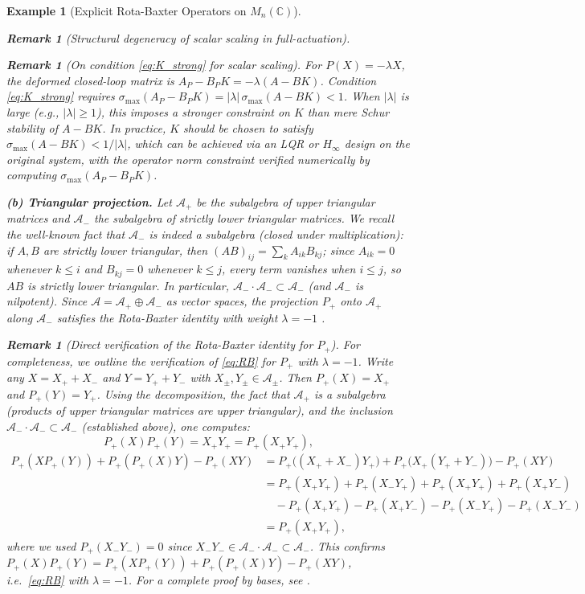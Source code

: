 \documentclass[10pt]{amsart}
\newcommand{\Ac}{\mathcal{A}}
\numberwithin{equation}{section}
\newtheorem{remark}[theorem]{Remark}
\newtheorem{example}[theorem]{Example}
\begin{document}
\begin{example}[Explicit Rota-Baxter Operators on \(M_n(\mathbb{C})\)]
\begin{remark}[Structural degeneracy of scalar scaling in full-actuation]
\begin{remark}[On condition \eqref{eq:K_strong} for scalar scaling]\label{rem:K_strong_scalar}
For $P(X)=-\lambda X$, the deformed closed-loop matrix is
$A_P - B_PK = -\lambda(A - BK)$. Condition \eqref{eq:K_strong} requires
$\sigma_{\max}(A_P - B_PK) = |\lambda|\,\sigma_{\max}(A-BK) < 1$.
When $|\lambda|$ is large (e.g., $|\lambda| \geq 1$), this imposes a stronger
constraint on $K$ than mere Schur stability of $A-BK$. In practice, $K$ should be
chosen to satisfy $\sigma_{\max}(A-BK) < 1/|\lambda|$, which can be achieved via
an LQR or $H_\infty$ design on the original system, with the operator norm
constraint verified numerically by computing $\sigma_{\max}(A_P-B_PK)$.
\end{remark}
\end{remark}

\medskip
\noindent\textbf{(b) Triangular projection.}
Let \(\Ac_+\) be the subalgebra of upper triangular matrices and \(\Ac_-\) the
subalgebra of strictly lower triangular matrices. We recall the well-known fact that
\(\Ac_-\) is indeed a subalgebra (closed under multiplication): if $A,B$ are strictly
lower triangular, then $(AB)_{ij} = \sum_k A_{ik}B_{kj}$; since $A_{ik}=0$ whenever
$k \leq i$ and $B_{kj}=0$ whenever $k \leq j$, every term vanishes when $i \leq j$, so
$AB$ is strictly lower triangular. In particular, $\Ac_-\cdot\Ac_- \subset \Ac_-$ (and
$\Ac_-$ is nilpotent). Since \(\Ac = \Ac_+ \oplus \Ac_-\) as vector spaces, the
projection \(P_+\) onto \(\Ac_+\) along \(\Ac_-\) satisfies the Rota-Baxter identity
with weight \(\lambda=-1\) \cite{BaiGuoNi2011}.

\begin{remark}[Direct verification of the Rota-Baxter identity for $P_+$]
\label{rem:RB_Pplus}
For completeness, we outline the verification of \eqref{eq:RB} for $P_+$ with
$\lambda = -1$. Write any $X = X_+ + X_-$ and $Y = Y_+ + Y_-$ with
$X_\pm, Y_\pm \in \Ac_\pm$. Then $P_+(X) = X_+$ and $P_+(Y) = Y_+$. Using the
decomposition, the fact that $\Ac_+$ is a subalgebra (products of upper triangular
matrices are upper triangular), and the inclusion $\Ac_-\cdot\Ac_- \subset \Ac_-$
(established above), one computes:
\[
  P_+(X)P_+(Y) = X_+ Y_+ = P_+(X_+Y_+),
\]
\begin{align*}
  P_+(XP_+(Y)) + P_+(P_+(X)Y) - P_+(XY)
  &= P_+\bigl((X_++X_-)Y_+\bigr) + P_+\bigl(X_+(Y_++Y_-)\bigr) - P_+(XY) \\
  &= P_+(X_+Y_+) + P_+(X_-Y_+)
     + P_+(X_+Y_+) + P_+(X_+Y_-)\\
  &\quad - P_+(X_+Y_+) - P_+(X_+Y_-)
     - P_+(X_-Y_+) - P_+(X_-Y_-)\\
  &= P_+(X_+Y_+),
\end{align*}
where we used $P_+(X_-Y_-) = 0$ since $X_-Y_- \in \Ac_-\cdot\Ac_- \subset \Ac_-$.
This confirms $P_+(X)P_+(Y) = P_+(XP_+(Y)) + P_+(P_+(X)Y) - P_+(XY)$, i.e.\
\eqref{eq:RB} with $\lambda=-1$. For a complete proof by bases, see
\cite[Example~1.1.14]{Guo2012}.
\end{remark}


\end{example}
\end{document}
